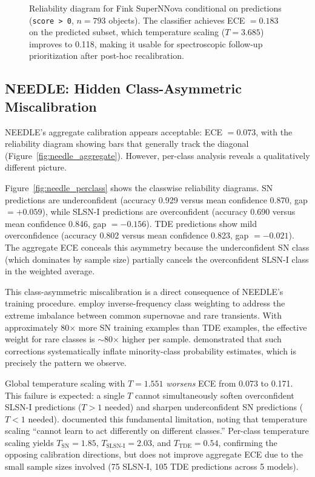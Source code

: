 \documentclass[twocolumn]{aastex631}
\begin{document}
\begin{figure}
\caption{Reliability diagram for Fink SuperNNova conditional on predictions (\texttt{score > 0}, $n = 793$ objects). The classifier achieves ECE $= 0.183$ on the predicted subset, which temperature scaling ($T = 3.685$) improves to 0.118, making it usable for spectroscopic follow-up prioritization after post-hoc recalibration. \label{fig:fink_snn_conditional}}
\end{figure}


\subsection{NEEDLE: Hidden Class-Asymmetric Miscalibration} \label{sec:needle}

NEEDLE's aggregate calibration appears acceptable: ECE $= 0.073$, with the reliability diagram showing bars that generally track the diagonal (Figure~\ref{fig:needle_aggregate}). However, per-class analysis reveals a qualitatively different picture.

Figure~\ref{fig:needle_perclass} shows the classwise reliability diagrams. SN predictions are underconfident (accuracy 0.929 versus mean confidence 0.870, gap $= +0.059$), while SLSN-I predictions are overconfident (accuracy 0.690 versus mean confidence 0.846, gap $= -0.156$). TDE predictions show mild overconfidence (accuracy 0.802 versus mean confidence 0.823, gap $= -0.021$). The aggregate ECE conceals this asymmetry because the underconfident SN class (which dominates by sample size) partially cancels the overconfident SLSN-I class in the weighted average.

This class-asymmetric miscalibration is a direct consequence of NEEDLE's training procedure. \citet{sheng2024} employ inverse-frequency class weighting to address the extreme imbalance between common supernovae and rare transients. With approximately 80$\times$ more SN training examples than TDE examples, the effective weight for rare classes is $\sim$80$\times$ higher per sample. \citet{vandengoorbergh2022} demonstrated that such corrections systematically inflate minority-class probability estimates, which is precisely the pattern we observe.

Global temperature scaling with $T = 1.551$ \emph{worsens} ECE from 0.073 to 0.171. This failure is expected: a single $T$ cannot simultaneously soften overconfident SLSN-I predictions ($T > 1$ needed) and sharpen underconfident SN predictions ($T < 1$ needed). \citet{kull2019} documented this fundamental limitation, noting that temperature scaling ``cannot learn to act differently on different classes.'' Per-class temperature scaling yields $T_{\text{SN}} = 1.85$, $T_{\text{SLSN-I}} = 2.03$, and $T_{\text{TDE}} = 0.54$, confirming the opposing calibration directions, but does not improve aggregate ECE due to the small sample sizes involved (75 SLSN-I, 105 TDE predictions across 5 models).
\end{document}
